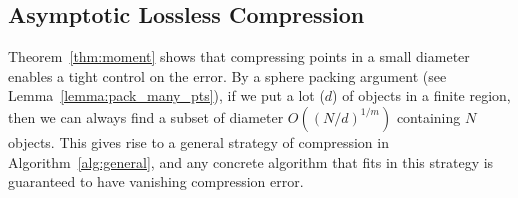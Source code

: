 \documentclass{article}
\theoremstyle{plain}
\begin{document}


\vspace{-2mm}
\subsection{Asymptotic Lossless Compression}
\label{ssec:lossless_cp}
\vspace{-1mm}

Theorem~\ref{thm:moment} shows that compressing points in a small diameter enables a tight control on the error. By a sphere packing argument (see Lemma~\ref{lemma:pack_many_pts}), if we put a lot ($d$) of objects in a finite region, then we can always find a subset of diameter $O((N/d)^{1/m})$ containing $N$ objects. This gives rise to a general strategy of compression in Algorithm~\ref{alg:general}, and any concrete algorithm that fits in this strategy is guaranteed to have vanishing compression error.
\end{document}
